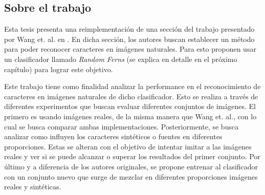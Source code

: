 \subsection{Sobre el trabajo}

	Esta tesis presenta una reimplementación de una sección del trabajo presentado por Wang et. al. en \cite{wang}. En dicha sección, los autores buscan establecer un método para poder reconocer caracteres en imágenes naturales. Para esto proponen usar un clasificador llamado \textit{Random Ferns} (se explica en detalle en el próximo capítulo) para lograr este objetivo.
	
	Este trabajo tiene como finalidad analizar la performance en el reconocimiento de caracteres en imágenes naturales de dicho clasificador. Esto se realiza a través de diferentes experimentos que buscan evaluar diferentes conjuntos de imágenes. El primero es usando imágenes reales, de la misma manera que Wang et. al., con lo cual se busca comparar ambas implementaciones. Posteriormente, se busca analizar como influyen los caracteres sintéticos o fuentes en diferentes proporciones. Estas se alteran con el objetivo de intentar imitar a las imágenes reales y ver si se puede alcanzar o superar los resultados del primer conjunto. Por último y a diferencia de los autores originales, se propone entrenar al clasificador con  un conjunto nuevo que surge de mezclar en diferentes proporciones imágenes reales y sintéticas.